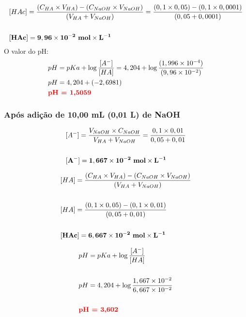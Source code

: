 \documentclass[a4paper, 12pt]{article}
\begin{document}
	\begin{align*}
		& [HAc] = \frac{ (C_{HA} \times V_{HA}) - (C_{NaOH} \times V_{NaOH}) }{ (V_{HA} + V_{NaOH}) } = \frac{ (0,1 \times 0,05) - (0,1 \times 0,0001) }{ (0,05 + 0,0001) }\\ \\
		& \mathbf{[HAc] = 9,96 \times 10^{-2} \text{ \textbf{mol}} \times L^{-1}}
	\end{align*}
O valor do pH:
	\begin{align*}
		& pH = pKa + \log \frac{[A^{-}]}{[HA]} = 4,204 + \log \frac{(1,996 \times 10^{-4})}{(9,96 \times 10^{-2})} \\
		& pH = 4,204 + (-2,6981) \\
		& \textbf{\textcolor{red}{pH = 1,5059}}
	\end{align*}

\subsubsection{Após adição de 10,00 mL (0,01 L) de NaOH}
	\begin{align*}
		& [A^{-}] = \frac{ V_{NaOH} \times C_{NaOH} }{ V_{HA} + V_{NaOH} } = \frac{0,1 \times 0,01}{0,05 + 0,01} \\ \\
		& \mathbf{[A^{-}] = 1,667 \times 10^{-2} \text{ \textbf{mol}} \times L^{-1}}
	\end{align*}

	\begin{align*}
		& [HA] = \frac{ (C_{HA} \times V_{HA}) - (C_{NaOH} \times V_{NaOH}) }{ (V_{HA} + V_{NaOH}) } \\ \\
		& [HA] = \frac{ (0,1 \times 0,05) - (0,1 \times 0,01) }{ (0,05 + 0,01) }\\ \\
		& \mathbf{[HAc] = 6,667 \times 10^{-2} \text{ \textbf{mol}} \times L^{-1}}
	\end{align*}

	\begin{align*}
		& pH = pKa + \log \frac{[A^{-}]}{[HA]} \\ \\
		& pH = 4,204 + \log \frac{1,667 \times 10^{-2}}{6,667 \times 10^{-2}} \\ \\
		& \textbf{\textcolor{red}{pH = 3,602}}
	\end{align*}
\end{document}
